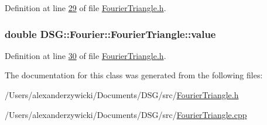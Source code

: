 Definition at line \hyperlink{_fourier_triangle_8h_source_l00029}{29} of file \hyperlink{_fourier_triangle_8h_source}{Fourier\+Triangle.\+h}.

\hypertarget{class_d_s_g_1_1_fourier_1_1_fourier_triangle_a11216186ce96fc78c7720cad3e01d025}{
\subsubsection[{value}]{\setlength{\rightskip}{0pt plus 5cm}double D\+S\+G\+::\+Fourier\+::\+Fourier\+Triangle\+::value\hspace{0.3cm}{\ttfamily [protected]}}}\label{class_d_s_g_1_1_fourier_1_1_fourier_triangle_a11216186ce96fc78c7720cad3e01d025}


Definition at line \hyperlink{_fourier_triangle_8h_source_l00030}{30} of file \hyperlink{_fourier_triangle_8h_source}{Fourier\+Triangle.\+h}.



The documentation for this class was generated from the following files\+:\begin{DoxyCompactItemize}
\item 
/\+Users/alexanderzywicki/\+Documents/\+D\+S\+G/src/\hyperlink{_fourier_triangle_8h}{Fourier\+Triangle.\+h}\item 
/\+Users/alexanderzywicki/\+Documents/\+D\+S\+G/src/\hyperlink{_fourier_triangle_8cpp}{Fourier\+Triangle.\+cpp}\end{DoxyCompactItemize}
